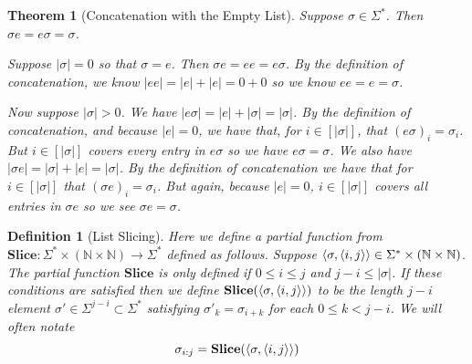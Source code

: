 \documentclass[12pt]{article}
\theoremstyle{break}
\newtheorem{definition}{Definition}[section]
\theoremstyle{break}
\newtheorem{theorem}{Theorem}[section]
\theoremstyle{break}
\theoremstyle{break}
\theoremstyle{break}
\newtheorem{informal definition}[definition]{Informal Definition}
\theoremstyle{break}
\newtheorem{informal theorem}[theorem]{Informal Theorem}
\begin{document}
	\begin{theorem}[Concatenation with the Empty List]
		Suppose $\sigma \in \Sigma^*$.
		Then $\sigma e = e \sigma = \sigma$.
		
		Suppose $|\sigma| = 0$ so that $\sigma = e$.
		Then $\sigma e = e e = e \sigma$.
		By the definition of concatenation, we know $|ee| = |e| + |e| = 0 + 0$ so we know $ee = e = \sigma$.
		
		Now suppose $|\sigma| > 0$.
		We have $|e \sigma| = |e| + |\sigma| = |\sigma|$.
		By the definition of concatenation, and because $|e| = 0$, we have that, for $i \in [|\sigma|]$, that $(e \sigma)_i = \sigma_i$.
		But $i \in [|\sigma|]$ covers every entry in $e \sigma$ so we have $e\sigma = \sigma$.
		We also have $|\sigma e| = |\sigma| + |e| = |\sigma|$.
		By the definition of concatenation we have that for $i \in [|\sigma|]$ that $(\sigma e)_i = \sigma_i$.
		But again, because $|e|=0$, $i \in [|\sigma|]$ covers all entries in $\sigma e$ so we see $\sigma e = \sigma$.
	\end{theorem}
	
	\begin{definition}[List Slicing]
		Here we define a partial function from $\textbf{Slice}:\Sigma^*\times (\mathbb{N} \times \mathbb{N}) \to \Sigma^*$ defined as follows.
		Suppose $\braket{\sigma, \braket{i, j}} \in \Sigma^* \times (\mathbb{N} \times \mathbb{N})$.
		The partial function $\textbf{Slice}$ is only defined if $0 \le i \le j$ and $j-i \le |\sigma|$.
		If these conditions are satisfied then we define $\textbf{Slice}(\braket{\sigma, \braket{i, j}})$ to be the length $j-i$ element $\sigma' \in \Sigma^{j-i} \subset \Sigma^*$ satisfying $\sigma'_k = \sigma_{i+k}$ for each $0 \le k < j-i$.
		We will often notate
		$$
		\sigma_{i:j} = \textbf{Slice}(\braket{\sigma, \braket{i, j}})
		$$
	\end{definition}
	
\end{document}
